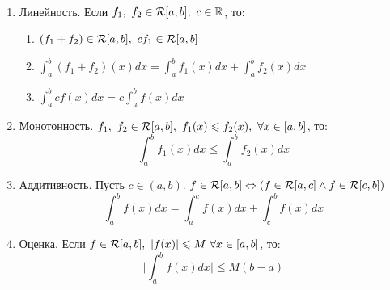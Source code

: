 \begin{theorem}\\
	\begin{enumerate}
		\item Линейность. Если $f_1,\ f_2\in\mathcal R[a,b],\ c\in\mathbb{R}$, то:
		\begin{enumerate}
			\item $(f_1+f_2)\in\mathcal R[a,b],\ cf_1\in\mathcal R[a,b]$\\
			\item $\displaystyle\int_a^b(f_1+f_2)(x)dx=\int_a^bf_1(x)dx+\int_a^bf_2(x)dx$\\
			\item $\displaystyle\int_a^bcf(x)dx=c\int_a^bf(x)dx$
		\end{enumerate}
		\item Монотонность. $f_1,\ f_2\in\mc R[a,b],\ f_1(x)\le f_2(x),\ \forall x\in[a,b]$, то:
		\[\int_a^bf_1(x)dx\le\int_a^bf_2(x)dx\]
		\item Аддитивность. Пусть $c\in(a,b)$. $f\in\mathcal R[a,b]\Leftrightarrow(f\in\mathcal R[a,c]\land f\in\mathcal R[c,b])$
		\[\int_a^bf(x)dx=\int_a^cf(x)dx+\int_c^bf(x)dx\]
		\item Оценка. Если $f\in\mc R[a,b],\ |f(x)|\le M\ \forall x\in[a,b]$, то:
		\[\bigg|\int_a^bf(x)dx\bigg|\le M(b-a)\]
	\end{enumerate}
\end{theorem}
